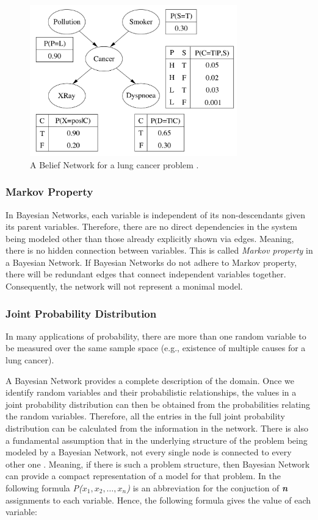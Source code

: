 \documentclass[11pt]{article}
\begin{document}
\begin{figure}[tbh]
  \center
  \includegraphics[width=0.8\textwidth]{figure/bbn.png}
  \caption{A Belief Network for a lung cancer problem
  \cite{korb:bayesian-ai}.}
  \label{fig:bbn}
\end{figure}

\subsubsection{Markov Property}

In Bayesian Networks, each variable is independent of its non-descendants given
its parent variables. Therefore, there are no direct dependencies in the system
being modeled other than those already explicitly shown via edges. Meaning,
there is no hidden connection between variables. This is called \textit{Markov
property} in a Bayesian Network. If Bayesian Networks do not adhere to Markov
property, there will be redundant edges that connect independent variables
together. Consequently, the network will not represent a monimal model.

\subsubsection{Joint Probability Distribution}

In many applications of probability, there are more than one random variable to
be measured over the same sample space (e.g., existence of multiple causes
for a lung cancer).

A Bayesian Network provides a complete description of the domain. Once we
identify random variables and their probabilistic relationships, the values in a
joint probability distribution can then be obtained from the probabilities
relating the random variables. Therefore, all the entries in the full joint
probability distribution can be calculated from the information in the network.
There is also a fundamental assumption that in the underlying structure of the
problem being modeled by a Bayesian Network, not every single node is connected
to every other one \cite{korb:bayesian-ai}. Meaning, if there is such a problem
structure, then Bayesian Network can provide a compact representation of a
model for that problem. In the following formula \textit{P($x_1, x_2, \ldots,
x_n$)} is an abbreviation for the conjuction of \textit{\textbf{n}} assignments
to each variable. Hence, the following formula gives the value of each variable:
\end{document}
